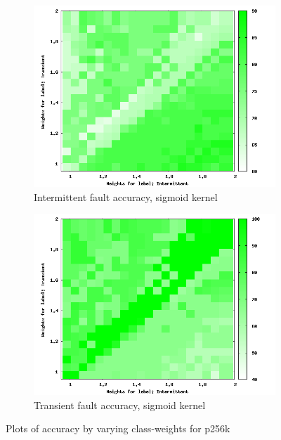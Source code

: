 \begin{figure}
        \begin{subfigure}[h]{0.45\linewidth}
                \includegraphics[scale=0.25]{figures/sig256i.png}
                \caption{Intermittent fault accuracy, sigmoid kernel}
        \end{subfigure}
			\begin{subfigure}[h]{0.45\linewidth}
                \includegraphics[scale=0.25]{figures/sig256t.png}
                \caption{Transient fault accuracy, sigmoid kernel}
        \end{subfigure}

        \caption{Plots of accuracy by varying class-weights for p256k}
        \label{fig:heatmap} 
\end{figure}



